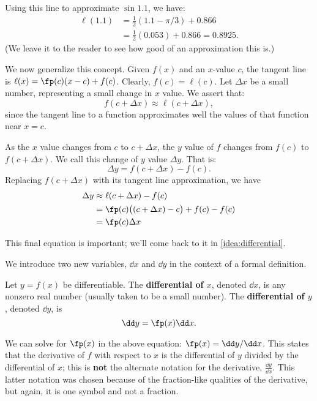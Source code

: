 Using this line to approximate $\sin 1.1$, we have:
\begin{align*}
	\ell(1.1) &= \frac12(1.1-\pi/3)+0.866 \\
					&= \frac12(0.053)+0.866 = 0.8925.
\end{align*}
(We leave it to the reader to see how good of an approximation this is.)\bigskip

We now generalize this concept. Given $f(x)$ and an $x$-value $c$,  the tangent line is $\ell(x) = \fp(c)(x-c)+f(c)$. Clearly, $f(c) = \ell(c)$. Let $\Delta x$ be a small number, representing a small change in $x$ value. We assert that:
\[f(c+\Delta x) \approx \ell(c+\Delta x),\]
since the tangent line to a function approximates well the values of that function near $x=c$. 

As the $x$ value changes from $c$ to $c+\Delta x$, the $y$ value of $f$ changes from $f(c)$ to $f(c+\Delta x)$. We call this change of $y$ value $\Delta y$. That is:
\[\Delta y = f(c+\Delta x)-f(c).\]
Replacing $f(c+\Delta x)$ with its tangent line approximation, we have 
\begin{align}
	\Delta y &\approx \ell(c+\Delta x) - f(c) \notag\\
	&= \fp(c)\bigl((c+\Delta x)-c\bigr)+f(c) - f(c)\notag \\
	&=\fp(c)\Delta x		\label{eq:differential}
\end{align}

This final equation is important; we'll come back to it in \autoref{idea:differential}.

We introduce two new variables, $\dd x$ and $\dd y$ in the context of a formal definition. %

\begin{definition}\label{def:differential}
Let $y=f(x)$ be differentiable. The \textbf{differential of $x$}, denoted $\dd x$, is any nonzero real number (usually taken to be a small number). The \textbf{differential of $y$}, denoted $\dd y$, is
\[\dd y = \fp(x)\dd x.\]
\end{definition}

We can solve for $\fp(x)$ in the above equation: $\fp(x) = \dd y/\dd x$. This states that the derivative of $f$ with respect to $x$ is the differential of $y$ divided by the differential of $x$; this is \textbf{not} the alternate notation for the derivative, $\frac{\dd y}{\dd x}$. This latter notation was chosen because of the fraction-like qualities of the derivative, but again, it is one symbol and not a fraction.


